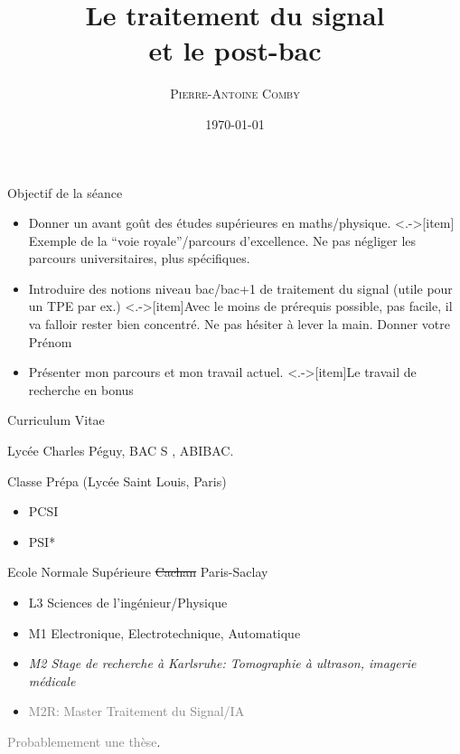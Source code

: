 \documentclass{beamer}
\title{Le traitement du signal \\et le post-bac}
\subtitle{}
\author[]{\textsc{Pierre-Antoine Comby}}
\institute{pierre-antoine.comby@ens-paris-saclay.fr}
\date{\today}
\begin{document}
\begin{frame}
   \titlepage
{}
 \end{frame}


\begin{frame}{Objectif de la séance}
  \begin{itemize}[<+(1)->]
    \item Donner un avant goût des études supérieures en maths/physique.
    \note<.->[item]{ Exemple de la ``voie royale''/parcours d'excellence. Ne pas négliger les parcours universitaires, plus spécifiques.}
    \item Introduire des notions niveau bac/bac+1 de traitement du signal (utile pour un TPE par ex.)
    \note<.->[item]{Avec le moins de prérequis possible, pas facile, il va falloir rester bien concentré. Ne pas hésiter à lever la main. Donner votre Prénom}
    \item Présenter mon parcours et mon travail actuel.
    \note<.->[item]{Le travail de recherche en bonus}
  \end{itemize}
\end{frame}

\begin{frame}{Curriculum Vitae}
  \begin{description}[<+(1)->]
    \item[2012-2015:] Lycée Charles Péguy, BAC S , ABIBAC.
    \item[2015-2017:] Classe Prépa (Lycée Saint Louis, Paris)
      \begin{itemize}[<.->]
        \item PCSI
        \item PSI*
      \end{itemize}
    \item[2017-2021:] Ecole Normale Supérieure \sout{Cachan} Paris-Saclay
      \begin{itemize}[<.->]
        \item L3 Sciences de l'ingénieur/Physique
        \item M1 Electronique, Electrotechnique, Automatique
        \item \textit{M2 Stage de recherche à Karlsruhe: Tomographie à ultrason, imagerie médicale}
        \item \textcolor{gray}{M2R: Master Traitement du Signal/IA}
      \end{itemize}
    \item[2021-futur:] \textcolor{gray}{Probablemement une thèse}.
  \end{description}
\end{frame}
\end{document}
